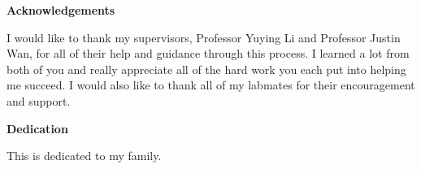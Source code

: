 \cleardoublepage


\begin{center}\textbf{Acknowledgements}\end{center}

I would like to thank my supervisors, Professor Yuying Li and Professor Justin Wan, for all of their help and guidance through this process. I learned a lot from both of you and really appreciate all of the hard work you each put into helping me succeed. I would also like to thank all of my labmates for their encouragement and support.
\cleardoublepage


\begin{center}\textbf{Dedication}\end{center}

This is dedicated to my family.
\cleardoublepage

\renewcommand\contentsname{Table of Contents}
\tableofcontents
\cleardoublepage
{}

\listoftables
\cleardoublepage
{}		%

\listoffigures
\cleardoublepage
{}		%



